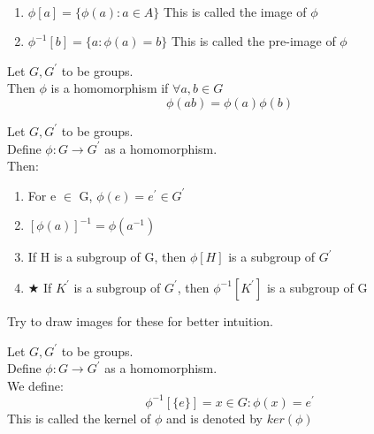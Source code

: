 
\begin{definition}[Images]
    \vphantom{}\\
    \begin{enumerate}
        \item $\phi [a] = \{\phi(a) : a \in A\}$ This is called the image of $\phi$\\ 
        \item $\phi^{-1}[b] = \{a : \phi(a) = b\}$ This is called the pre-image of $\phi$\\
    \end{enumerate}
\end{definition}

\begin{definition}
    Let $G, G^{\prime}$ to be groups.\\
    Then $\phi$ is a homomorphism if $\forall a, b \in G$\\
    \[\phi(ab) = \phi(a)\phi(b)\]
\end{definition}

\begin{theorem}
    Let $G, G^{\prime}$ to be groups.\\ Define $\phi : G \rightarrow G^{\prime}$ as a homomorphism.\\
    Then:
    \begin{enumerate}
        \item For e $\in$ G, $\phi(e) = e^{\prime} \in G^{\prime}$\\
        \item $[\phi(a)]^{-1} = \phi(a^{-1})$\\
        \item If H is a subgroup of G, then $\phi[H]$ is a subgroup of $G^{\prime}$\\
        \item $\bigstar$ If $K^{\prime}$ is a subgroup of $G^{\prime}$, then $\phi^{-1}[K^{\prime}]$ is a subgroup of G\\
    \end{enumerate}
    Try to draw images for these for better intuition.\\
\end{theorem}

\begin{definition}[Kernel]
    Let $G, G^{\prime}$ to be groups.\\ Define $\phi : G \rightarrow G^{\prime}$ as a homomorphism.\\
    We define: \[\phi^{-1}[\{e\}] = x \in G : \phi(x) = e^{\prime}\]
    This is called the kernel of $\phi$ and is denoted by $ker(\phi)$\\
\end{definition}

